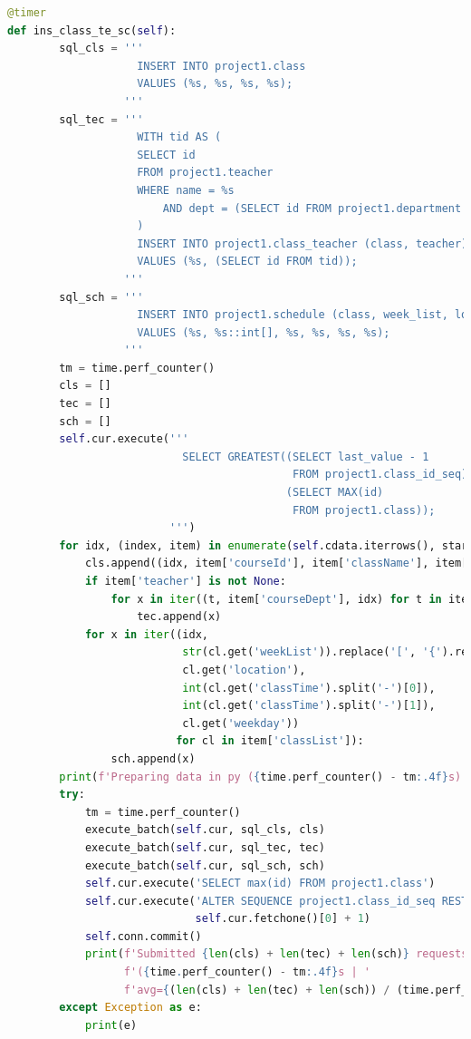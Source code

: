 \begin{lstlisting}[language=python]
@timer
def ins_class_te_sc(self):
        sql_cls = '''
                    INSERT INTO project1.class
                    VALUES (%s, %s, %s, %s);
                  '''
        sql_tec = '''
                    WITH tid AS (
                    SELECT id
                    FROM project1.teacher
                    WHERE name = %s
                        AND dept = (SELECT id FROM project1.department WHERE name = %s)
                    )
                    INSERT INTO project1.class_teacher (class, teacher)
                    VALUES (%s, (SELECT id FROM tid));
                  '''
        sql_sch = '''
                    INSERT INTO project1.schedule (class, week_list, location, starting, ending, weekday)
                    VALUES (%s, %s::int[], %s, %s, %s, %s);
                  '''
        tm = time.perf_counter()
        cls = []
        tec = []
        sch = []
        self.cur.execute('''
                           SELECT GREATEST((SELECT last_value - 1
                                            FROM project1.class_id_seq),
                                           (SELECT MAX(id)
                                            FROM project1.class));
                         ''')
        for idx, (index, item) in enumerate(self.cdata.iterrows(), start=self.cur.fetchone()[0] + 1):
            cls.append((idx, item['courseId'], item['className'], item['totalCapacity']))
            if item['teacher'] is not None:
                for x in iter((t, item['courseDept'], idx) for t in item['teacher']):
                    tec.append(x)
            for x in iter((idx,
                           str(cl.get('weekList')).replace('[', '{').replace(']', '}'),
                           cl.get('location'),
                           int(cl.get('classTime').split('-')[0]),
                           int(cl.get('classTime').split('-')[1]),
                           cl.get('weekday'))
                          for cl in item['classList']):
                sch.append(x)
        print(f'Preparing data in py ({time.perf_counter() - tm:.4f}s)', end=' >>> ')
        try:
            tm = time.perf_counter()
            execute_batch(self.cur, sql_cls, cls)
            execute_batch(self.cur, sql_tec, tec)
            execute_batch(self.cur, sql_sch, sch)
            self.cur.execute('SELECT max(id) FROM project1.class')
            self.cur.execute('ALTER SEQUENCE project1.class_id_seq RESTART WITH %s;',
                             self.cur.fetchone()[0] + 1)
            self.conn.commit()
            print(f'Submitted {len(cls) + len(tec) + len(sch)} requests '
                  f'({time.perf_counter() - tm:.4f}s | '
                  f'avg={(len(cls) + len(tec) + len(sch)) / (time.perf_counter() - tm):.4f}i/s)')
        except Exception as e:
            print(e)
\end{lstlisting}
